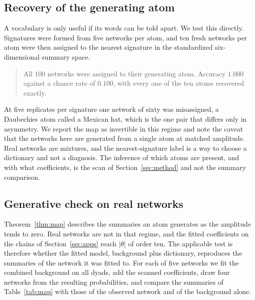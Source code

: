 \documentclass[11pt]{article}
\theoremstyle{definition}
\newcommand{\1}{\mathbf 1}\newcommand{\op}{\operatorname}
\begin{document}
\subsection{Recovery of the generating atom}

A vocabulary is only useful if its words can be told apart.  We test this
directly.  Signatures were formed from five networks per atom, and ten
fresh networks per atom were then assigned to the nearest signature in the
standardized six-dimensional summary space.

\begin{quote}
All $100$ networks were assigned to their generating atom.  Accuracy
$1.000$ against a chance rate of $0.100$, with every one of the ten atoms
recovered exactly.
\end{quote}

At five replicates per signature one network of sixty was misassigned, a
Daubechies atom called a Mexican hat, which is the one pair that differs
only in asymmetry.  We report the map as invertible in this regime and note
the caveat that the networks here are generated from a single atom at
matched amplitude.  Real networks are mixtures, and the nearest-signature
label is a way to choose a dictionary and not a diagnosis.  The inference
of which atoms are present, and with what coefficients, is the scan of
Section~\ref{sec:method} and not the summary comparison.

\subsection{Generative check on real networks}          \label{sec:gencheck}

Theorem~\ref{thm:map} describes the summaries an atom generates as the
amplitude tends to zero.  Real networks are not in that regime, and the
fitted coefficients on the chains of Section~\ref{sec:apps} reach $|\theta|$
of order ten.  The applicable test is therefore whether the fitted model,
background plus dictionary, reproduces the summaries of the network it was
fitted to.  For each of five networks we fit the combined background on all
dyads, add the scanned coefficients, draw four networks from the resulting
probabilities, and compare the summaries of Table~\ref{tab:map} with
those of the observed network and of the background alone.
\end{document}
